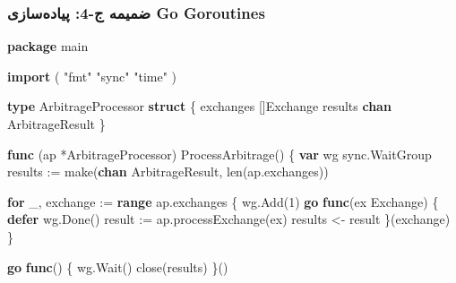 \documentclass[
]{article}
\newenvironment{Shaded}{}{}
\newcommand{\BuiltInTok}[1]{\textcolor[rgb]{0.00,0.50,0.00}{#1}}
\newcommand{\ControlFlowTok}[1]{\textcolor[rgb]{0.00,0.44,0.13}{\textbf{#1}}}
\newcommand{\DecValTok}[1]{\textcolor[rgb]{0.25,0.63,0.44}{#1}}
\newcommand{\KeywordTok}[1]{\textcolor[rgb]{0.00,0.44,0.13}{\textbf{#1}}}
\newcommand{\NormalTok}[1]{#1}
\newcommand{\OperatorTok}[1]{\textcolor[rgb]{0.40,0.40,0.40}{#1}}
\newcommand{\StringTok}[1]{\textcolor[rgb]{0.25,0.44,0.63}{#1}}
\begin{document}
\subsubsection{ضمیمه ج-4: پیاده‌سازی Go
Goroutines}\label{ux636ux645ux6ccux645ux647-ux62c-4-ux67eux6ccux627ux62fux647ux633ux627ux632ux6cc-go-goroutines}

\begin{Shaded}
\begin{Highlighting}[]
\KeywordTok{package}\NormalTok{ main}

\KeywordTok{import} \OperatorTok{(}
    \StringTok{"fmt"}
    \StringTok{"sync"}
    \StringTok{"time"}
\OperatorTok{)}

\KeywordTok{type}\NormalTok{ ArbitrageProcessor }\KeywordTok{struct} \OperatorTok{\{}
\NormalTok{    exchanges }\OperatorTok{[]}\NormalTok{Exchange}
\NormalTok{    results   }\KeywordTok{chan}\NormalTok{ ArbitrageResult}
\OperatorTok{\}}

\KeywordTok{func} \OperatorTok{(}\NormalTok{ap }\OperatorTok{*}\NormalTok{ArbitrageProcessor}\OperatorTok{)}\NormalTok{ ProcessArbitrage}\OperatorTok{()} \OperatorTok{\{}
    \KeywordTok{var}\NormalTok{ wg sync}\OperatorTok{.}\NormalTok{WaitGroup}
\NormalTok{    results }\OperatorTok{:=} \BuiltInTok{make}\OperatorTok{(}\KeywordTok{chan}\NormalTok{ ArbitrageResult}\OperatorTok{,} \BuiltInTok{len}\OperatorTok{(}\NormalTok{ap}\OperatorTok{.}\NormalTok{exchanges}\OperatorTok{))}

    \ControlFlowTok{for}\NormalTok{ \_}\OperatorTok{,}\NormalTok{ exchange }\OperatorTok{:=} \KeywordTok{range}\NormalTok{ ap}\OperatorTok{.}\NormalTok{exchanges }\OperatorTok{\{}
\NormalTok{        wg}\OperatorTok{.}\NormalTok{Add}\OperatorTok{(}\DecValTok{1}\OperatorTok{)}
        \ControlFlowTok{go} \KeywordTok{func}\OperatorTok{(}\NormalTok{ex Exchange}\OperatorTok{)} \OperatorTok{\{}
            \ControlFlowTok{defer}\NormalTok{ wg}\OperatorTok{.}\NormalTok{Done}\OperatorTok{()}
\NormalTok{            result }\OperatorTok{:=}\NormalTok{ ap}\OperatorTok{.}\NormalTok{processExchange}\OperatorTok{(}\NormalTok{ex}\OperatorTok{)}
\NormalTok{            results }\OperatorTok{\textless{}{-}}\NormalTok{ result}
        \OperatorTok{\}(}\NormalTok{exchange}\OperatorTok{)}
    \OperatorTok{\}}

    \ControlFlowTok{go} \KeywordTok{func}\OperatorTok{()} \OperatorTok{\{}
\NormalTok{        wg}\OperatorTok{.}\NormalTok{Wait}\OperatorTok{()}
        \BuiltInTok{close}\OperatorTok{(}\NormalTok{results}\OperatorTok{)}
    \OperatorTok{\}()}


\end{Highlighting}
\end{Shaded}
\end{document}
